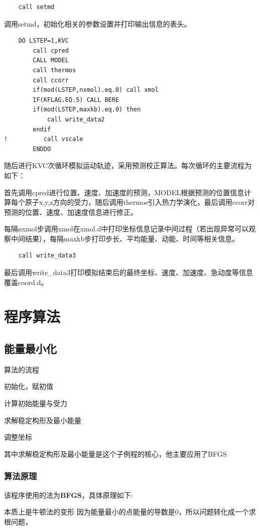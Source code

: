 \documentclass{ctexart}
\begin{document}
\begin{verbatim}
    call setmd
\end{verbatim}
调用setmd，初始化相关的参数设置并打印输出信息的表头。
\begin{verbatim}
    DO LSTEP=1,KVC
        call cpred  
        CALL MODEL 
        call thermos 
        call ccorr
        if(mod(LSTEP,nxmol).eq.0) call xmol
        IF(KFLAG.EQ.5) CALL BERE
        if(mod(LSTEP,maxkb).eq.0) then
            call write_data2 
        endif  
!          call vscale 
        ENDDO
\end{verbatim}
随后进行KVC次循环模拟运动轨迹，采用预测校正算法。每次循环的主要流程为如下：

首先调用cpred进行位置、速度、加速度的预测，MODEL根据预测的位置信息计算每个原子x,y,z方向的受力，随后调用thermos引入热力学演化，最后调用ccorr对预测的位置、速度、加速度信息进行修正。

每隔nxmol步调用xmol在xmol.d中打印坐标信息记录中间过程（若出现异常可以观察中间结果），每隔maxkb步打印步长、平均能量、动能、时间等相关信息。

\begin{verbatim}
    call write_data3
\end{verbatim}
最后调用write\_data3打印模拟结束后的最终坐标、速度、加速度、急动度等信息覆盖coord.d。

\section{程序算法}
\subsection{能量最小化}

算法的流程

初始化，赋初值

计算初始能量与受力

求解稳定构形及最小能量

调整坐标

其中求解稳定构形及最小能量是这个子例程的核心，他主要应用了BFGS

\subsubsection{算法原理}

该程序使用的法为\textbf{BFGS}，具体原理如下:

本质上是牛顿法的变形
因为能量最小的点能量的导数是0，所以问题转化成一个求根问题，
\end{document}
